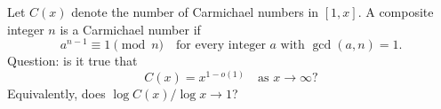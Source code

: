 Let $C(x)$ denote the number of Carmichael numbers in $[1,x]$.
A composite integer $n$ is a Carmichael number if
\[
a^{n-1}\equiv 1\pmod n\quad\text{for every integer }a\text{ with }\gcd(a,n)=1.
\]
Question: is it true that
\[
C(x)=x^{1-o(1)}\quad\text{as }x\to\infty?
\]
Equivalently, does $\log C(x)/\log x \to 1$?
